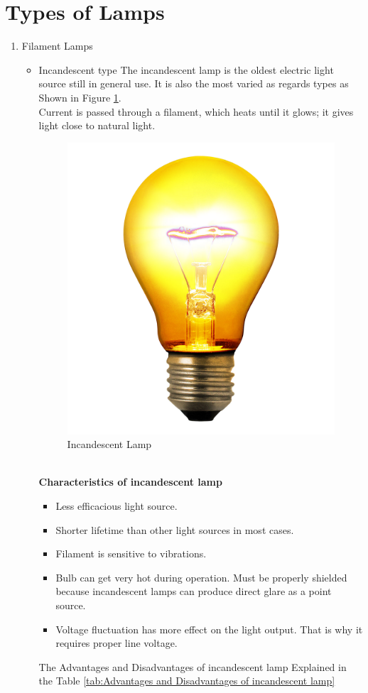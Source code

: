 \documentclass[12pt,fleqn]{book} %
\begin{document}
  \section{Types of Lamps}
\begin{enumerate}
    \item Filament Lamps 
    \begin{itemize}
        \item Incandescent type
        The incandescent lamp is the oldest electric light source still in general use. It is also the most varied as regards types as Shown in Figure \ref{fig:fikry 6}.\\
        Current is passed through a filament, which heats until it glows; it gives light close to natural light.
        \begin{figure}[!h]
    \centering
    \includegraphics[width=0.5\linewidth]{fikry 6.png}
    \caption{Incandescent Lamp}
    \label{fig:fikry 6}
\end{figure}
\\ \textbf{Characteristics of incandescent lamp}
\begin{itemize}
 \item Less efficacious light source.
 \item Shorter lifetime than other light sources in most cases.
 \item Filament is sensitive to vibrations.
 \item Bulb can get very hot during operation.
Must be properly shielded because incandescent lamps can produce direct glare as a point source.
 \item Voltage fluctuation has more effect on the light output. That is why it requires proper line voltage.
\end{itemize}
The Advantages and Disadvantages of incandescent lamp Explained in the Table \ref{tab:Advantages and Disadvantages of incandescent lamp}

\end{itemize}
\end{enumerate}
\end{document}

